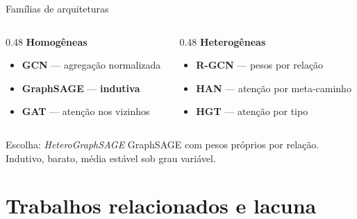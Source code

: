 \documentclass[aspectratio=169]{beamer}
\newcommand{\dest}[1]{\textcolor{ufprB}{\textbf{#1}}}
\newcommand{\azul}[1]{\textcolor{ufprA}{\textbf{#1}}}
\begin{document}
\begin{frame}{Famílias de arquiteturas}
  \begin{columns}[T]
  \begin{column}{0.48\textwidth}
    \textbf{\azul{Homogêneas}}
    \begin{itemize}\small
      \item \textbf{GCN} --- agregação normalizada
      \item \textbf{GraphSAGE} --- \dest{indutiva}
      \item \textbf{GAT} --- atenção nos vizinhos
    \end{itemize}
  \end{column}
  \begin{column}{0.48\textwidth}
    \textbf{\azul{Heterogêneas}}
    \begin{itemize}\small
      \item \textbf{R-GCN} --- pesos por relação
      \item \textbf{HAN} --- atenção por meta-caminho
      \item \textbf{HGT} --- atenção por tipo
    \end{itemize}
  \end{column}
  \end{columns}
  \vfill
  \begin{block}{Escolha: \emph{HeteroGraphSAGE}}
    GraphSAGE com pesos próprios por relação. Indutivo, barato, média estável sob grau variável.
  \end{block}
  \vfill
\end{frame}

\section{Trabalhos relacionados e lacuna}
\end{document}
